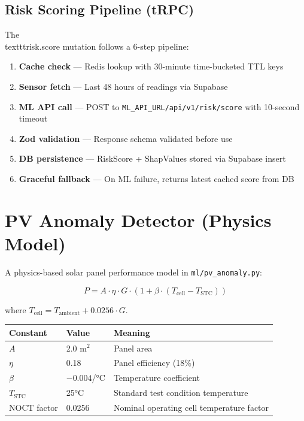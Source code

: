 \documentclass[12pt,a4paper]{report}
\begin{document}
\subsection{Risk Scoring Pipeline (tRPC)}

The \\texttt{risk.score} mutation follows a 6-step pipeline:

\begin{enumerate}
  \item \textbf{Cache check} --- Redis lookup with 30-minute time-bucketed TTL keys
  \item \textbf{Sensor fetch} --- Last 48 hours of readings via Supabase
  \item \textbf{ML API call} --- POST to \texttt{ML\_API\_URL/api/v1/risk/score} with 10-second timeout
  \item \textbf{Zod validation} --- Response schema validated before use
  \item \textbf{DB persistence} --- RiskScore + ShapValues stored via Supabase insert
  \item \textbf{Graceful fallback} --- On ML failure, returns latest cached score from DB
\end{enumerate}

\section{PV Anomaly Detector (Physics Model)}

A physics-based solar panel performance model in \texttt{ml/pv\_anomaly.py}:

\begin{equation}
P = A \cdot \eta \cdot G \cdot (1 + \beta \cdot (T_{\text{cell}} - T_{\text{STC}}))
\end{equation}

where $T_{\text{cell}} = T_{\text{ambient}} + 0.0256 \cdot G$.

\begin{tabularx}{\textwidth}{llX}
\toprule
\textbf{Constant} & \textbf{Value} & \textbf{Meaning} \\
\midrule
$A$          & 2.0 m$^2$      & Panel area \\
$\eta$       & 0.18           & Panel efficiency (18\%) \\
$\beta$      & $-0.004$/°C   & Temperature coefficient \\
$T_{\text{STC}}$ & 25°C      & Standard test condition temperature \\
NOCT factor  & 0.0256         & Nominal operating cell temperature factor \\
\bottomrule
\end{tabularx}
\end{document}
